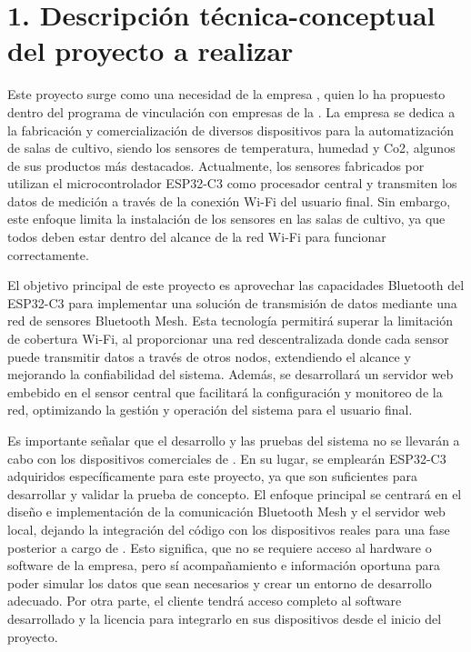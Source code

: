 \documentclass[
11pt, %
]{charter}
\begin{document}
\section{1. Descripción técnica-conceptual del proyecto a realizar}
\label{sec:descripcion}
Este proyecto surge como una necesidad de la empresa {\empclientename}, quien lo ha propuesto dentro del programa de vinculación con empresas de la {\degreename}. La empresa se dedica a la fabricación y comercialización de diversos dispositivos para la automatización de salas de cultivo, siendo los sensores de temperatura, humedad y Co2, algunos de sus productos más destacados. Actualmente, los sensores fabricados por {\empclientename} utilizan el microcontrolador ESP32-C3 como procesador central y transmiten los datos de medición a través de la conexión Wi-Fi del usuario final. Sin embargo, este enfoque limita la instalación de los sensores en las salas de cultivo, ya que todos deben estar dentro del alcance de la red Wi-Fi para funcionar correctamente.

El objetivo principal de este proyecto es aprovechar las capacidades Bluetooth del ESP32-C3 para implementar una solución de transmisión de datos mediante una red de sensores Bluetooth Mesh. Esta tecnología permitirá superar la limitación de cobertura Wi-Fi, al proporcionar una red descentralizada donde cada sensor puede transmitir datos a través de otros nodos, extendiendo el alcance y mejorando la confiabilidad del sistema. Además, se desarrollará un servidor web embebido en el sensor central que facilitará la configuración y monitoreo de la red, optimizando la gestión y operación del sistema para el usuario final.

Es importante señalar que el desarrollo y las pruebas del sistema no se llevarán a cabo con los dispositivos comerciales de {\empclientename}. En su lugar, se emplearán ESP32-C3 adquiridos específicamente para este proyecto, ya que son suficientes para desarrollar y validar la prueba de concepto. El enfoque principal se centrará en el diseño e implementación de la comunicación Bluetooth Mesh y el servidor web local, dejando la integración del código con los dispositivos reales para una fase posterior a cargo de {\empclientename}. Esto significa, que no se requiere acceso al hardware o software de la empresa, pero sí acompañamiento e información oportuna para poder simular los datos que sean necesarios y crear un entorno de desarrollo adecuado. Por otra parte, el cliente tendrá acceso completo al software desarrollado y la licencia para integrarlo en sus dispositivos desde el inicio del proyecto.
\end{document}
